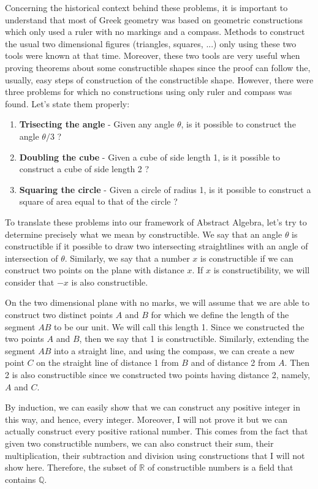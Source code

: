 \documentclass{article}
\theoremstyle{plain}
\theoremstyle{definition}
\newcommand{\R}{\mathbb{R}}
\newcommand{\Q}{\mathbb{Q}}
\begin{document}
Concerning the historical context behind these problems, it is important to understand that most of Greek geometry was based on geometric constructions which only used a ruler with no markings and a compass. Methods to construct the usual two dimensional figures (triangles, squares, ...) only using these two tools were known at that time. Moreover, these two tools are very useful when proving theorems about some constructible shapes since the proof can follow the, usually, easy steps of construction of the constructible shape. However, there were three problems for which no constructions using only ruler and compass was found. Let's state them properly:

\begin{enumerate}
    \item \textbf{Trisecting the angle} - Given any angle $\theta$, is it possible to construct the angle $\theta / 3$ ?
    \item \textbf{Doubling the cube} - Given a cube of side length 1, is it possible to construct a cube of side length 2 ?
    \item \textbf{Squaring the circle} - Given a circle of radius 1, is it possible to construct a square of area equal to that of the circle ?
\end{enumerate}

To translate these problems into our framework of Abstract Algebra, let's try to determine precisely what we mean by constructible. We say that an angle $\theta$ is constructible if it possible to draw two intersecting straightlines with an angle of intersection of $\theta$. Similarly, we say that a number $x$ is constructible if we can construct two points on the plane with distance $x$. If $x$ is constructibility, we will consider that $-x$ is also constructible.

On the two dimensional plane with no marks, we will assume that we are able to construct two distinct points $A$ and $B$ for which we define the length of the segment $AB$ to be our unit. We will call this length 1. Since we constructed the two points $A$ and $B$, then we say that 1 is constructible. Similarly, extending the segment $AB$ into a straight line, and using the compass, we can create a new point $C$ on the straight line of distance 1 from $B$ and of distance 2 from $A$. Then 2 is also constructible since we constructed two points having distance 2, namely, $A$ and $C$. 

By induction, we can easily show that we can construct any positive integer in this way, and hence, every integer. Moreover, I will not prove it but we can actually construct every positive rational number. This comes from the fact that given two constructible numbers, we can also construct their sum, their multiplication, their subtraction and division using constructions that I will not show here. Therefore, the subset of $\R$ of constructible numbers is a field that contains $\Q$. 
\end{document}
